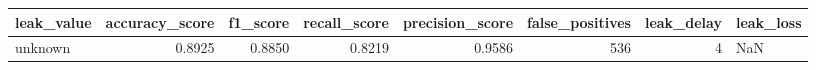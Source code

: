 \begin{tabular}{lrrrrrrl}
\toprule
leak\_value & accuracy\_score & f1\_score & recall\_score & precision\_score & false\_positives & leak\_delay & leak\_loss \\
\midrule
unknown & 0.8925 & 0.8850 & 0.8219 & 0.9586 & 536 & 4 & NaN \\
\bottomrule
\end{tabular}
